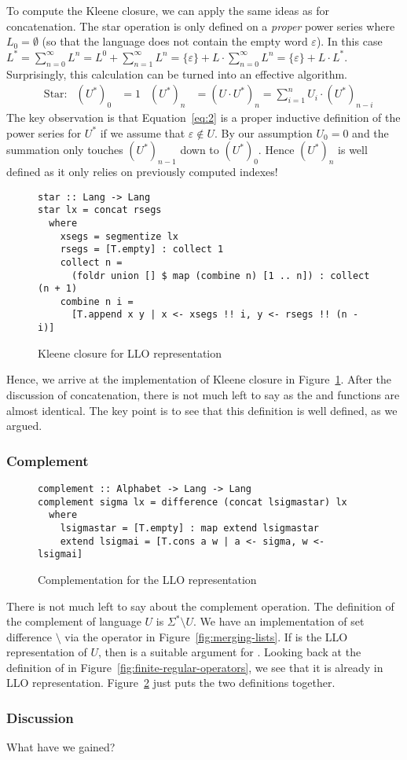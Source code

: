 To compute the Kleene closure, we can apply the same ideas as for
concatenation. The star operation is only defined on a \emph{proper}
power series where $L_0 = \emptyset$ (so that the language does not
contain the empty word $\varepsilon$). In this case $L^* =
\sum_{n=0}^\infty L^n = L^0 + \sum_{n=1}^\infty L^n = \{\varepsilon\}
+ L \cdot \sum_{n=0}^\infty L^n  =   \{\varepsilon\}
+ L \cdot L^*$. Surprisingly, this calculation can be turned into an
effective algorithm. 
\begin{align}
  \label{eq:2}
  &\text{Star:}
  & (U^*)_0 &= 1
  & (U^*)_n &= (U \cdot U^*)_n = \sum_{i=1}^n U_i\cdot (U^*)_{n-i}
\end{align}
The key observation is that Equation~\eqref{eq:2} is a proper
inductive definition of the power series for $U^*$ if we assume that
$\varepsilon \notin U$. By our assumption $U_0 = 0$ and the summation
only touches $(U^*)_{n-1}$ down to $(U^*)_0$. Hence $(U^*)_n$ is well
defined as it only relies on previously computed indexes!

\begin{figure}[tp]
\begin{lstlisting}
star :: Lang -> Lang
star lx = concat rsegs
  where
    xsegs = segmentize lx
    rsegs = [T.empty] : collect 1
    collect n =
      (foldr union [] $ map (combine n) [1 .. n]) : collect (n + 1)
    combine n i =
      [T.append x y | x <- xsegs !! i, y <- rsegs !! (n - i)]
\end{lstlisting}
  \caption{Kleene closure for LLO representation}
  \label{fig:star-with-segments}
\end{figure}
Hence, we arrive at the implementation of Kleene closure in Figure~\ref{fig:star-with-segments}.
After the discussion of concatenation, there is not much left to say
as the  and  functions are almost
identical. The key point is to see that this definition is well
defined, as we argued.

\subsubsection{Complement}
\begin{figure}[tp]
\begin{lstlisting}
complement :: Alphabet -> Lang -> Lang
complement sigma lx = difference (concat lsigmastar) lx
  where
    lsigmastar = [T.empty] : map extend lsigmastar
    extend lsigmai = [T.cons a w | a <- sigma, w <- lsigmai]
\end{lstlisting}
  \caption{Complementation for the LLO representation}
  \label{fig:llo-complement}
\end{figure}
There is not much left to say about the complement operation. The
definition of the complement of language $U$ is $\Sigma^*\setminus
U$. We have an implementation of set difference
$\setminus$ via the  operator in
Figure~\ref{fig:merging-lists}.  If  is the LLO
representation of $U$, then  is a suitable argument for
.  Looking back at the definition of
 in Figure~\ref{fig:finite-regular-operators}, we see
that it is already in LLO
representation. Figure~\ref{fig:llo-complement} just puts the two
definitions together.

\subsubsection{Discussion}
What have we gained?

\clearpage{}
